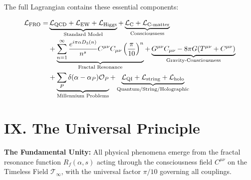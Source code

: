 \documentclass[11pt]{article}
\begin{document}
The full Lagrangian contains these essential components:

\begin{align}
\mathcal{L}_{\text{FRO}} = &\underbrace{\mathcal{L}_{\text{QCD}} + \mathcal{L}_{\text{EW}} + \mathcal{L}_{\text{Higgs}}}_{\text{Standard Model}} 
+ \underbrace{\mathcal{L}_{\text{C}} + \mathcal{L}_{\text{C-matter}}}_{\text{Consciousness}} \notag\\
&+ \underbrace{\sum_{n=1}^{\infty}\frac{e^{i\pi\alpha D_3(n)}}{n^s}C^{\mu\nu}C_{\mu\nu}\left(\frac{\pi}{10}\right)^n}_{\text{Fractal Resonance}} 
+ \underbrace{G^{\mu\nu}C_{\mu\nu} - 8\pi G(T^{\mu\nu} + C^{\mu\nu})}_{\text{Gravity-Consciousness}} \notag\\
&+ \underbrace{\sum_{P}\delta(\alpha-\alpha_P)\mathcal{O}_P}_{\text{Millennium Problems}} 
+ \underbrace{\mathcal{L}_{\text{QI}} + \mathcal{L}_{\text{string}} + \mathcal{L}_{\text{holo}}}_{\text{Quantum/String/Holographic}}
\end{align}

\section*{IX. The Universal Principle}

\begin{tcolorbox}[colback=yellow!10!white,colframe=orange]
\textbf{The Fundamental Unity:} All physical phenomena emerge from the fractal resonance function $R_f(\alpha, s)$ acting through the consciousness field $C^{\mu\nu}$ on the Timeless Field $\mathcal{T}_\infty$, with the universal factor $\pi/10$ governing all couplings.
\end{tcolorbox}
\end{document}
